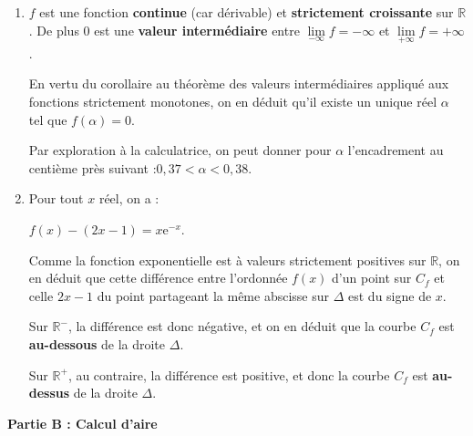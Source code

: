 \documentclass[10pt]{article}
\providecommand{\R}{\mathbb{R}}
\providecommand{\e}{{\mathrm{e}}}
\begin{document}
\begin{enumerate}
Le minimum de $f'$ est donc un réel supérieur à 1, donc strictement positif.

On en déduit que $f'$ est donc une fonction à valeurs strictement positives sur $\R$, en conséquence, $f$ est effectivement une fonction strictement croissante sur $\R$.

\item $f$ est une fonction \textbf{continue} (car dérivable) et \textbf{strictement croissante} sur $\R$. De plus 0 est une \textbf{valeur intermédiaire} entre $\lim\limits_{-\infty} f = -\infty$ et $\lim\limits_{+\infty} f = +\infty$.

En vertu du corollaire au théorème des valeurs intermédiaires appliqué aux fonctions strictement monotones, on en déduit qu'il existe un unique réel $\alpha$ tel que $f(\alpha)=0$.

Par exploration à la calculatrice, on peut donner pour $\alpha$ l'encadrement au centième près suivant :\quad $0,37 < \alpha < 0,38$.

\item Pour tout $x$ réel, on a :

$f(x) - (2x-1) = x\e^{-x}$.

Comme la fonction exponentielle est  à valeurs strictement positives sur $\R$, on en déduit que cette différence entre l'ordonnée $f(x)$ d'un point sur $C_f$ et celle $2x - 1$ du point partageant la même abscisse sur $\Delta$ est du signe de $x$.

Sur $\R^-$, la différence est donc négative, et on en déduit que la courbe $C_f$ est \textbf{au-dessous} de la droite $\Delta$.

Sur $\R^+$, au contraire, la différence est positive, et donc la courbe $C_f$ est \textbf{au-dessus} de la droite $\Delta$.
\end{enumerate}

\medskip

\textbf{Partie B : Calcul d'aire}

\medskip
\end{document}
